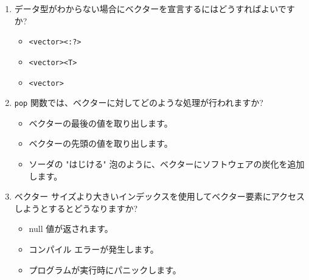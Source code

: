 \begin{enumerate}
\item データ型がわからない場合にベクターを宣言するにはどうすればよいですか?

\begin{itemize}
\item \texttt{<vector><:?>}

\item \texttt{<vector><T>}

\item \texttt{<vector>}
\end{itemize}

\item \texttt{pop} 関数では、ベクターに対してどのような処理が行われますか?

\begin{itemize}
\item ベクターの最後の値を取り出します。

\item ベクターの先頭の値を取り出します。

\item ソーダの "はじける" 泡のように、ベクターにソフトウェアの炭化を追加します。
\end{itemize}

\item ベクター サイズより大きいインデックスを使用してベクター要素にアクセスしようとするとどうなりますか?

\begin{itemize}
\item null 値が返されます。

\item コンパイル エラーが発生します。

\item プログラムが実行時にパニックします。
\end{itemize}
\end{enumerate}

